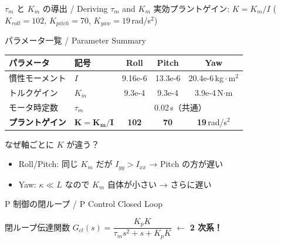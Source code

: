 \begin{frame}{$\tau_m$ と $K_m$ の導出 / Deriving $\tau_m$ and $K_m$}
  \vspace{0.5em}
  \centering
  実効プラントゲイン: \; $K = K_m / I$
  \quad ($K_{roll}\!=\!102$,\; $K_{pitch}\!=\!70$,\; $K_{yaw}\!=\!19$\,rad/s$^2$)
\end{frame}

\begin{frame}{パラメータ一覧 / Parameter Summary}
  \begin{table}
    \centering
    \begin{tabular}{llccc}
      \hline
      \textbf{パラメータ} & \textbf{記号} & \textbf{Roll} & \textbf{Pitch} & \textbf{Yaw} \\
      \hline
      慣性モーメント & $I$ & 9.16e-6 & 13.3e-6 & 20.4e-6\,kg\,$\cdot$\,m$^2$ \\
      トルクゲイン & $K_m$ & 9.3e-4 & 9.3e-4 & 3.9e-4\,N$\cdot$m \\
      モータ時定数 & $\tau_m$ & \multicolumn{3}{c}{0.02\,s（共通）} \\
      \hline
      \textbf{プラントゲイン} & $\bm{K = K_m/I}$
        & \textbf{102} & \textbf{70} & \textbf{19}\,rad/s$^2$ \\
      \hline
    \end{tabular}
  \end{table}

  \vspace{0.5em}

  \begin{exampleblock}{なぜ軸ごとに $K$ が違う？}
    \begin{itemize}
      \item Roll/Pitch: 同じ $K_m$ だが $I_{yy} > I_{xx}$ → Pitch の方が遅い
      \item Yaw: $\kappa \ll L$ なので $K_m$ 自体が小さい → さらに遅い
    \end{itemize}
  \end{exampleblock}
\end{frame}

\begin{frame}{P 制御の閉ループ / P Control Closed Loop}
  \begin{center}
    \vspace{-2mm}
    \resizebox{0.85\textwidth}{!}{}
  \end{center}

  \vspace{-0.5em}

  \begin{block}{閉ループ伝達関数}
    $G_{cl}(s) = \dfrac{K_p K}{\tau_m s^2 + s + K_p K}$
    \hfill $\longleftarrow$ \textbf{2 次系！}
  \end{block}
\end{frame}

